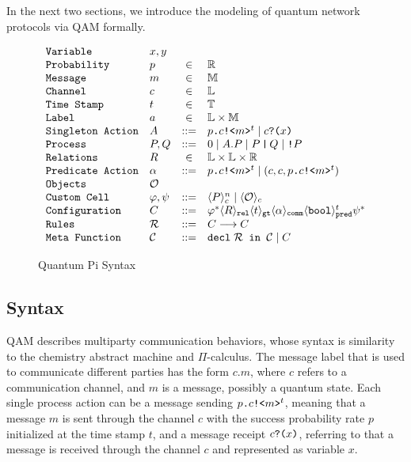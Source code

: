 In the next two sections, we introduce the modeling of quantum network protocols via QAM formally.

\begin{figure}[t]
{\small
  \[\begin{array}{llcl} 
      \texttt{Variable} & x,y \\
      \texttt{Probability} & p &\in &\mathbb{R}\\
      \texttt{Message} & m &\in& \mathbb{M}\\
    \texttt{Channel} & c &\in& \mathbb{L}\\
    \texttt{Time Stamp} & t &\in& \mathbb{T}\\
    \texttt{Label} & a &\in& \mathbb{L} \times \mathbb{M}\\
      \texttt{Singleton Action} & A & ::= & p\texttt{.}c\texttt{!<}m\texttt{>}^t \mid c\texttt{?(}x\texttt{)} \\
      \texttt{Process} & P,Q & ::= & 0 \mid A.P \mid P\,\texttt{|}\,Q \mid \texttt{!}P \\
      \texttt{Relations} & R & \in & \mathbb{L} \times \mathbb{L} \times \mathbb{R} \\
      \texttt{Predicate Action} & \alpha & ::= & p\texttt{.}c\texttt{!<}m\texttt{>}^t \mid (c,c,p\texttt{.}c\texttt{!<}m\texttt{>}^t) \\
      \texttt{Objects} & \mathcal{O} \\
      \texttt{Custom Cell} & \varphi,\psi & ::= & \langle P \rangle^{n}_{c} \mid \langle \mathcal{O} \rangle_{c}\\
      \texttt{Configuration} & C & ::= & \varphi^* \langle R \rangle_{\texttt{rel}} \langle t \rangle_{\texttt{gt}}
                             \langle \alpha \rangle_{\texttt{comm}} \langle \texttt{bool} \rangle^{t}_{\texttt{pred}} \psi^* \\
      \texttt{Rules} & \mathcal{R} & ::= & C \longrightarrow C \\
      \texttt{Meta Function} & \mathcal{C} & ::= & \texttt{decl}\;\mathcal{R}\texttt{ in }\mathcal{C} \mid C\\
    \end{array}
  \]
}
\caption{Quantum Pi Syntax}
  \label{fig:q-pi-syntax}
\end{figure}


\subsection{Syntax} \label{sec:qamsyntax}

QAM describes multiparty communication behaviors,
whose syntax is similarity to the chemistry abstract machine \cite{BERRY1992217} and $\Pi$-calculus.
The message label that is used to communicate different parties has the form $c.m$, 
where $c$ refers to a communication channel, and $m$ is a message, possibly a quantum state.
Each single process action can be a message sending $p\texttt{.}c\texttt{!<}m\texttt{>}^t$, meaning that a message $m$ is sent through the channel $c$ with the success probability rate $p$ initialized at the time stamp $t$, and a message receipt $c\texttt{?(}x\texttt{)}$, referring to that a message is received through the channel $c$ and represented as variable $x$.

